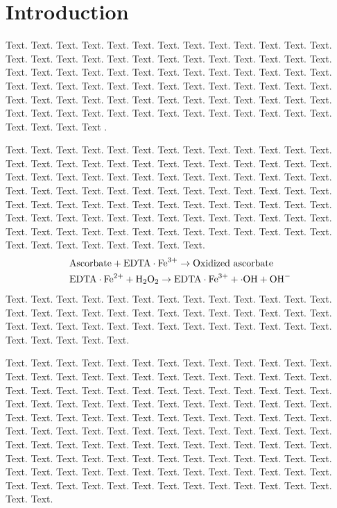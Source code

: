 \documentclass[a4,center,fleqn]{NAR}
\begin{document}
\section{Introduction}

Text. Text. Text. Text. Text. Text. Text. Text. Text. Text. Text.
Text. Text. Text. Text. Text. Text. Text. Text. Text. Text. Text.
Text. Text. Text. Text. Text. Text. Text. Text. Text. Text. Text.
Text. Text. Text. Text. Text. Text. Text. Text. Text. Text. Text.
Text. Text. Text. Text. Text. Text. Text. Text. Text. Text. Text.
Text. Text. Text. Text. Text. Text. Text. Text. Text. Text. Text.
Text. Text. Text. Text. Text. Text. Text. Text. Text. Text. Text.
Text. Text. Text. Text.
Text \cite{1}.

Text. Text. Text. Text. Text. Text. Text. Text. Text. Text. Text.
Text. Text. Text. Text. Text. Text. Text. Text. Text. Text. Text.
Text. Text. Text. Text. Text. Text. Text. Text. Text. Text. Text.
Text. Text. Text. Text. Text. Text. Text. Text. Text. Text. Text.
Text. Text. Text. Text. Text. Text. Text. Text. Text. Text. Text.
Text. Text. Text. Text. Text. Text. Text. Text. Text. Text. Text.
Text. Text. Text. Text. Text. Text. Text. Text. Text. Text. Text.
Text. Text. Text. Text. Text. Text. Text. Text. Text. Text. Text.
Text. Text. Text. Text. Text. Text. Text. Text. Text. Text. Text.
\begin{align*}
&\mathrm{Ascorbate} + \mathrm{EDTA} \cdot \mathrm{Fe}^{3+} \to
\hbox{Oxidized ascorbate}
\\
&\mathrm{EDTA} \cdot \mathrm{Fe}^{2+} + \mathrm{H}_2
\mathrm{O}_2 \to
\mathrm{EDTA} \cdot \mathrm{Fe}^{3+} + \cdot
\mathrm{OH} + \mathrm{OH}^-
\end{align*}
Text. Text. Text. Text. Text. Text. Text. Text. Text. Text. Text.
Text. Text. Text. Text. Text. Text. Text. Text. Text. Text. Text.
Text. Text. Text. Text. Text. Text. Text. Text. Text. Text. Text.
Text. Text. Text. Text. Text. Text. Text. Text. Text. Text. Text.

Text. Text. Text. Text. Text. Text. Text. Text. Text. Text. Text.
Text. Text. Text. Text. Text. Text. Text. Text. Text. Text. Text.
Text. Text. Text. Text. Text. Text. Text. Text. Text. Text. Text.
Text. Text. Text. Text. Text. Text. Text. Text. Text. Text. Text.
Text. Text. Text. Text. Text. Text. Text. Text. Text. Text. Text.
Text. Text. Text. Text. Text. Text. Text. Text. Text. Text. Text.
Text. Text. Text. Text. Text. Text. Text. Text. Text. Text. Text.
Text. Text. Text. Text. Text. Text. Text. Text. Text. Text. Text.
Text. Text. Text. Text. Text. Text. Text. Text. Text. Text. Text.
Text. Text. Text. Text. Text. Text. Text. Text. Text. Text. Text.
Text. Text. Text. Text. Text. Text. Text. Text. Text. Text. Text.
Text. Text. Text. Text. Text. Text. Text. Text. Text. Text. Text.
\enlargethispage{-65.1pt}
\end{document}
